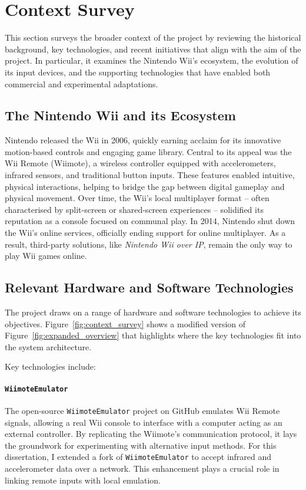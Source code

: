 \chapter{Context Survey}
\label{chapter:context}

This section surveys the broader context of the project by reviewing the historical background, key technologies, and recent initiatives that align with the aim of the project. In particular, it examines the Nintendo Wii’s ecosystem, the evolution of its input devices, and the supporting technologies that have enabled both commercial and experimental adaptations.

\section{The Nintendo Wii and its Ecosystem}
Nintendo released the Wii in 2006, quickly earning acclaim for its innovative motion-based controls and engaging game library. Central to its appeal was the Wii Remote (Wiimote), a wireless controller equipped with accelerometers, infrared sensors, and traditional button inputs. These features enabled intuitive, physical interactions, helping to bridge the gap between digital gameplay and physical movement. Over time, the Wii’s local multiplayer format -- often characterised by split-screen or shared-screen experiences -- solidified its reputation as a console focused on communal play. In 2014, Nintendo shut down the Wii’s online services\cite{nintendoTerminationNintendo}, officially ending support for online multiplayer. As a result, third-party solutions, like \textit{Nintendo Wii over IP}, remain the only way to play Wii games online.

\section{Relevant Hardware and Software Technologies}
The project draws on a range of hardware and software technologies to achieve its objectives. Figure~\ref{fig:context_survey} shows a modified version of Figure~\ref{fig:expanded_overview} that highlights where the key technologies fit into the system architecture.


Key technologies include:

\subsubsection{\texttt{WiimoteEmulator}\cite{wiimote_emulator}}
The open-source \texttt{WiimoteEmulator} project on GitHub emulates Wii Remote signals, allowing a real Wii console to interface with a computer acting as an external controller. By replicating the Wiimote’s communication protocol, it lays the groundwork for experimenting with alternative input methods. For this dissertation, I extended a fork of \texttt{WiimoteEmulator} to accept infrared and accelerometer data over a network. This enhancement plays a crucial role in linking remote inputs with local emulation.

